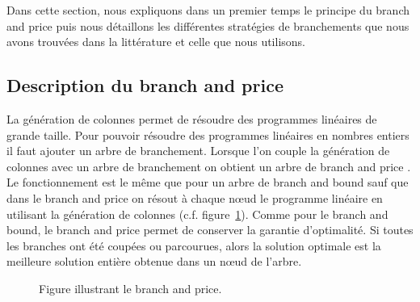 Dans cette section, nous expliquons dans un premier temps  
le principe du branch and price puis nous détaillons les différentes stratégies de branchements que nous avons trouvées dans la littérature et celle que nous utilisons.

\subsection{Description du branch and price}
La génération de colonnes permet de résoudre des programmes linéaires de grande taille.
Pour pouvoir résoudre des programmes linéaires en nombres entiers il faut ajouter un arbre de branchement.
Lorsque l'on couple la génération de colonnes avec un arbre de branchement on obtient un arbre de branch and price \cite{dantzig1961decomposition,barnhart1998branch}.
Le fonctionnement est le même que pour un arbre de branch and bound sauf que dans le branch and price on résout à chaque n\oe ud le programme linéaire en utilisant la génération de colonnes (c.f. figure~\ref{fig:BP}).
Comme pour le branch and bound, le branch and price permet de conserver la garantie d'optimalité.
Si toutes les branches ont été coupées ou parcourues, alors la solution optimale est la meilleure solution entière obtenue dans un n\oe ud de l'arbre.

\begin{figure}
[H]
\centering
{}
\caption{Figure illustrant le branch and price.\label{fig:BP}}
\end{figure}


